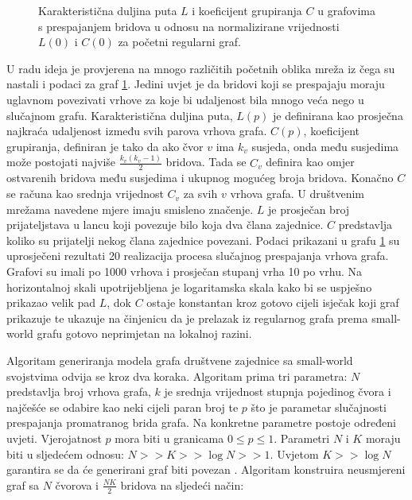 \begin{figure}
	\caption{Karakteristična duljina puta $L$ i koeficijent grupiranja $C$ u grafovima s prespajanjem bridova u odnosu na normalizirane vrijednosti $L(0)$ i $C(0)$ za početni regularni graf.}
	\label{fig:C&L}
\end{figure}

U radu\cite{watts1998collective} ideja je provjerena na mnogo različitih početnih oblika mreža iz čega su nastali i podaci za graf \ref{fig:C&L}. Jedini uvjet je da bridovi koji se prespajaju moraju uglavnom povezivati vrhove za koje bi udaljenost bila mnogo veća nego u slučajnom grafu. Karakteristična duljina puta, $L(p)$ je definirana kao prosječna najkraća udaljenost između svih parova vrhova grafa. $C(p)$, koeficijent grupiranja, definiran je tako da ako čvor $v$ ima $k_{v}$ susjeda, onda među susjedima može postojati najviše $\frac{k_{v}(k_{v} - 1)}{2}$ bridova. Tada se $C_{v}$ definira kao omjer ostvarenih bridova među susjedima i ukupnog mogućeg broja bridova. Konačno $C$ se računa kao srednja vrijednost $C_{v}$ za svih $v$ vrhova grafa. U društvenim mrežama navedene mjere imaju smisleno značenje. $L$ je prosječan broj prijateljstava u lancu koji povezuje bilo koja dva člana zajednice. $C$ predstavlja koliko su prijatelji nekog člana zajednice povezani. Podaci prikazani u grafu \ref{fig:C&L} su uprosječeni rezultati 20 realizacija procesa slučajnog prespajanja vrhova grafa. Grafovi su imali po 1000 vrhova i prosječan stupanj vrha 10 po vrhu. Na horizontalnoj skali upotrijebljena je logaritamska skala kako bi se uspješno prikazao velik pad  $L$, dok $C$ ostaje konstantan kroz gotovo cijeli isječak koji graf prikazuje te ukazuje na činjenicu da je prelazak iz regularnog grafa prema small-world grafu gotovo neprimjetan na lokalnoj razini.


Algoritam generiranja modela grafa društvene zajednice sa small-world svojstvima odvija se kroz dva koraka. Algoritam prima tri parametra: $N$ predstavlja broj vrhova grafa, $k$ je srednja vrijednost stupnja pojedinog čvora i najčešće se odabire kao neki cijeli paran broj te $p$ što je parametar slučajnosti prespajanja promatranog brida grafa. Na konkretne parametre postoje određeni uvjeti. Vjerojatnost $p$ mora biti u granicama $0 \leq p \leq 1$. Parametri $N$ i $K$ moraju biti u sljedećem odnosu: $N >> K >> \log N >> 1$. Uvjetom $ K >> \log N$ garantira se da će generirani graf biti povezan \cite{Bollobas2001}. Algoritam konstruira neusmjereni graf sa $N$ čvorova i $\frac{NK}{2}$ bridova na sljedeći način:

